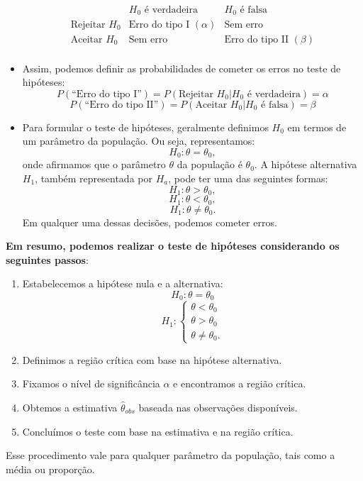 \documentclass{article}
\begin{document}
\begin{itemize}
        $$
        \begin{array}{c|c|c}
         & H_0 \text{ é verdadeira} & H_0 \text{ é falsa} \\
        \hline
        \text{Rejeitar } H_0 & \text{Erro do tipo I } (\alpha) & \text{Sem erro} \\
        \hline
        \text{Aceitar } H_0 & \text{Sem erro} & \text{Erro do tipo II } (\beta) \\
        \end{array}
        $$
    \item Assim, podemos definir as probabilidades de cometer os erros no teste de hipóteses:
        $$
        P(\text{``Erro do tipo I''}) = P(\text{Rejeitar } H_0 | H_0 \text{ é verdadeira}) = \alpha
        $$
        $$
        P(\text{``Erro do tipo II''}) = P(\text{Aceitar } H_0 | H_0 \text{ é falsa}) = \beta
        $$
    \item Para formular o teste de hipóteses, geralmente definimos $H_0$ em termos de um parâmetro da população. Ou seja, representamos:
        $$
        H_0 : \theta = \theta_0,
        $$
    onde afirmamos que o parâmetro $\theta$ da população é $\theta_0$.  
    A hipótese alternativa $H_1$, também representada por $H_a$, pode ter uma das seguintes formas:
        $$
        H_1 : \theta > \theta_0,
        $$
        $$
        H_1 : \theta < \theta_0,
        $$
        $$
        H_1 : \theta \neq \theta_0.
        $$
    Em qualquer uma dessas decisões, podemos cometer erros.
\end{itemize}

\textbf{Em resumo, podemos realizar o teste de hipóteses considerando os seguintes passos}:
\begin{enumerate}
    \item Estabelecemos a hipótese nula e a alternativa:  
       $$
       H_0 : \theta = \theta_0 
       $$
       $$
       H_1 : 
       \begin{cases} 
       \theta < \theta_0 \\ 
       \theta > \theta_0 \\ 
       \theta \neq \theta_0.
       \end{cases}
       $$
   \item Definimos a região crítica com base na hipótese alternativa.
   \item Fixamos o nível de significância $\alpha$ e encontramos a região crítica.
   \item Obtemos a estimativa $\hat{\theta}_{obs}$ baseada nas observações disponíveis.
   \item Concluímos o teste com base na estimativa e na região crítica.  
\end{enumerate}
Esse procedimento vale para qualquer parâmetro da população, tais como a média ou proporção.
\end{document}
